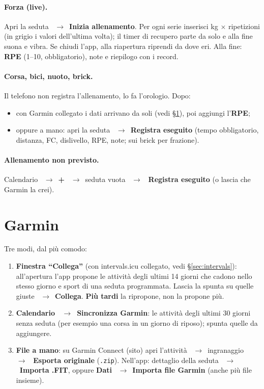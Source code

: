 \documentclass[11pt,a4paper]{article}
\newcommand{\ra}{\unskip\nobreak\ $\rightarrow$\ \ignorespaces}            %
\newcommand{\bt}[1]{\textbf{#1}}               %
\newcommand{\code}[1]{\texttt{#1}}             %
\newcommand{\sezione}[1]{\S\ref{#1}}           %
\begin{document}
\paragraph{Forza (live).} Apri la seduta \ra \bt{Inizia allenamento}. Per ogni serie inserisci
kg $\times$ ripetizioni (in grigio i valori dell'ultima volta); il timer di recupero parte da solo
e alla fine suona e vibra. Se chiudi l'app, alla riapertura riprendi da dove eri. Alla fine:
\bt{RPE} (1--10, obbligatorio), note e riepilogo con i record.

\paragraph{Corsa, bici, nuoto, brick.} Il telefono non registra l'allenamento, lo fa l'orologio. Dopo:
\begin{itemize}
  \item con Garmin collegato i dati arrivano da soli (vedi \sezione{sec:garmin}), poi aggiungi l'\bt{RPE};
  \item oppure a mano: apri la seduta \ra \bt{Registra eseguito} (tempo obbligatorio, distanza,
        FC, dislivello, RPE, note; sui brick per frazione).
\end{itemize}

\paragraph{Allenamento non previsto.} Calendario \ra \bt{+} \ra seduta vuota \ra
\bt{Registra eseguito} (o lascia che Garmin la crei).

\section{Garmin}\label{sec:garmin}

Tre modi, dal più comodo:

\begin{enumerate}
  \item \bt{Finestra ``Collega''} (con intervals.icu collegato, vedi \sezione{sec:intervals}):
    all'apertura l'app propone le attività degli ultimi 14 giorni che cadono nello stesso giorno
    e sport di una seduta programmata. Lascia la spunta su quelle giuste \ra \bt{Collega}.
    \bt{Più tardi} la ripropone, \bt{\texttimes} non la propone più.
  \item \bt{Calendario \ra Sincronizza Garmin}: le attività degli ultimi 30 giorni senza seduta
    (per esempio una corsa in un giorno di riposo); spunta quelle da aggiungere.
  \item \bt{File a mano}: su Garmin Connect (sito) apri l'attività \ra ingranaggio \ra
    \bt{Esporta originale} (\code{.zip}). Nell'app: dettaglio della seduta \ra \bt{Importa .FIT},
    oppure \bt{Dati} \ra \bt{Importa file Garmin} (anche più file insieme).
\end{enumerate}
\end{document}
